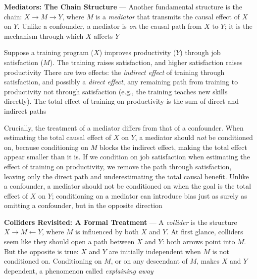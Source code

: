 
\textbf{Mediators: The Chain Structure} --- Another fundamental structure is the
chain: $X \rightarrow M \rightarrow Y$, where $M$ is a \emph{mediator} that
transmits the causal effect of $X$ on $Y$. Unlike a confounder, a mediator is
\emph{on} the causal path from $X$ to $Y$; it is the mechanism through which $X$
affects $Y$

Suppose a training program ($X$) improves productivity ($Y$) through job satisfaction
($M$). The training raises satisfaction, and higher satisfaction raises productivity
There are two effects: the \emph{indirect effect} of training through
satisfaction, and possibly a \emph{direct effect}, any remaining path from training
to productivity not through satisfaction (e.g., the training teaches new skills
directly). The total effect of training on productivity is the sum of direct and
indirect paths

Crucially, the treatment of a mediator differs from that of a confounder. When estimating
the total causal effect of $X$ on $Y$, a mediator should \emph{not} be conditioned
on, because conditioning on $M$ blocks the indirect effect, making the total effect
appear smaller than it is. If we condition on job satisfaction when estimating
the effect of training on productivity, we remove the path through satisfaction,
leaving only the direct path and underestimating the total causal benefit. Unlike
a confounder, a mediator should not be conditioned on when the goal is the total
effect of $X$ on $Y$; conditioning on a mediator can introduce bias just as surely
as omitting a confounder, but in the opposite direction


\textbf{Colliders Revisited: A Formal Treatment} --- A \emph{collider} is the
structure $X \rightarrow M \leftarrow Y$, where $M$ is influenced by both $X$ and
$Y$. At first glance, colliders seem like they should open a path between $X$ and
$Y$: both arrows point into $M$. But the opposite is true: $X$ and $Y$ are
initially independent when $M$ is not conditioned on. Conditioning on $M$, or on
any descendant of $M$, makes $X$ and $Y$ dependent, a phenomenon called \emph{explaining
away}

